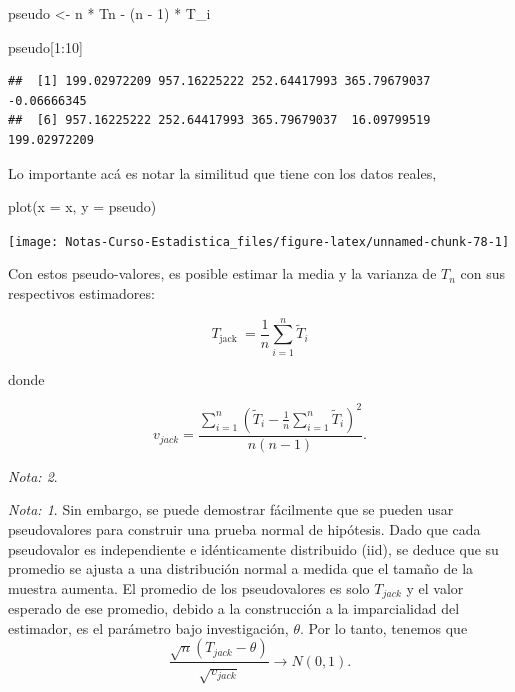 \documentclass[
  12pt,
]{book}
\newenvironment{Shaded}{\begin{snugshade}}{\end{snugshade}}
\newcommand{\AttributeTok}[1]{\textcolor[rgb]{0.77,0.63,0.00}{#1}}
\newcommand{\DecValTok}[1]{\textcolor[rgb]{0.00,0.00,0.81}{#1}}
\newcommand{\FunctionTok}[1]{\textcolor[rgb]{0.00,0.00,0.00}{#1}}
\newcommand{\NormalTok}[1]{#1}
\newcommand{\OtherTok}[1]{\textcolor[rgb]{0.56,0.35,0.01}{#1}}
\newcommand{\SpecialCharTok}[1]{\textcolor[rgb]{0.00,0.00,0.00}{#1}}
\theoremstyle{definition}
\theoremstyle{definition}
\theoremstyle{definition}
\theoremstyle{remark}
\newtheorem*{remark}{Nota: }
\begin{document}
\begin{Shaded}
\begin{Highlighting}[]
\NormalTok{pseudo }\OtherTok{\textless{}{-}}\NormalTok{ n }\SpecialCharTok{*}\NormalTok{ Tn }\SpecialCharTok{{-}}\NormalTok{ (n }\SpecialCharTok{{-}} \DecValTok{1}\NormalTok{) }\SpecialCharTok{*}\NormalTok{ T\_i}

\NormalTok{pseudo[}\DecValTok{1}\SpecialCharTok{:}\DecValTok{10}\NormalTok{]}
\end{Highlighting}
\end{Shaded}

\begin{verbatim}
##  [1] 199.02972209 957.16225222 252.64417993 365.79679037  -0.06666345
##  [6] 957.16225222 252.64417993 365.79679037  16.09799519 199.02972209
\end{verbatim}

Lo importante acá es notar la similitud que tiene con los datos
reales,

\begin{Shaded}
\begin{Highlighting}[]
\FunctionTok{plot}\NormalTok{(}\AttributeTok{x =}\NormalTok{ x, }\AttributeTok{y =}\NormalTok{ pseudo)}
\end{Highlighting}
\end{Shaded}

\begin{center}\texttt{[image: Notas-Curso-Estadistica\_files/figure-latex/unnamed-chunk-78-1]} \end{center}

Con estos pseudo-valores, es posible estimar la media y la varianza de
\(T_{n}\) con sus respectivos estimadores:

\[
T_{\text {jack }}=\frac{1}{n} \sum_{i=1}^{n} \widetilde{T}_{i}
\]

donde

\[
v_{jack}=\frac{\sum_{i=1}^{n}\left(\widetilde{T}_{i}-\frac{1}{n}
\sum_{i=1}^{n} \widetilde{T}_{i}\right)^{2}}{n(n-1)}.
\]

\begin{remark}
\begin{remark}

{}
Sin embargo, se puede demostrar fácilmente que se pueden usar
pseudovalores para construir una prueba normal de hipótesis. Dado que
cada pseudovalor es independiente e idénticamente distribuido (iid),
se deduce que su promedio se ajusta a una distribución normal a medida
que el tamaño de la muestra aumenta. El promedio de los pseudovalores
es solo \(T_ {jack}\) y el valor esperado de ese promedio, debido a la
construcción a la imparcialidad del estimador, es el parámetro bajo
investigación, \(\theta\). Por lo tanto, tenemos que
\[
  \frac{\sqrt{n}\left(T_{jack}-\theta\right)}{\sqrt{v_{jack}}}
  \rightarrow N(0,1).
\]

\end{remark}
\end{remark}
\end{document}
